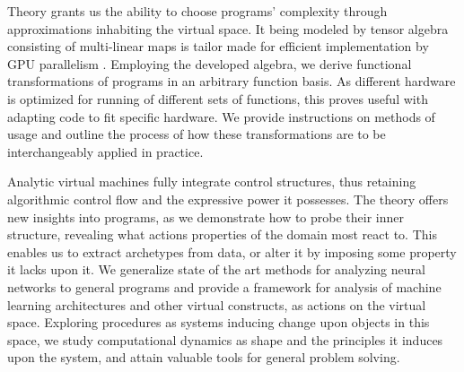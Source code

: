 \documentclass{article}
\begin{document}
Theory grants us the ability to choose programs' complexity through approximations inhabiting the virtual space. It being modeled by tensor algebra consisting of multi-linear maps is tailor made for efficient implementation by GPU parallelism \cite{TensorGPU}. Employing the developed algebra, we derive functional transformations of programs in an arbitrary function basis. As different hardware is optimized for running of different sets of functions, this proves useful with adapting code to fit specific hardware.
We provide instructions on methods of usage and outline the process of how these transformations are to be interchangeably applied in practice. 

Analytic virtual machines fully integrate control structures, thus retaining algorithmic control flow and the expressive power it possesses. The theory offers new insights into programs, as we demonstrate how to probe their inner structure, revealing what actions properties of the domain most react to. This enables us to extract archetypes from data, or alter it by imposing some property it lacks upon it.
We generalize state of the art methods for analyzing neural networks \cite{DeepDream} to general programs and provide a framework for analysis of machine learning architectures and other virtual constructs, as actions on the virtual space. Exploring procedures as systems inducing change upon objects in this space, we study computational dynamics as shape and the principles it induces upon the system, and attain valuable tools for general problem solving.
\end{document}
